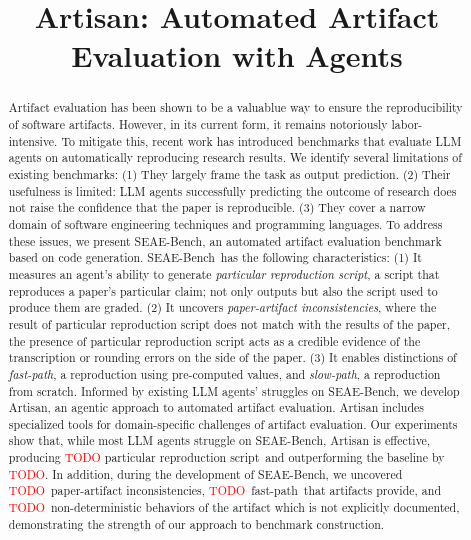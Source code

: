 \documentclass[acmsmall,screen,review,anonymous]{acmart}
\begin{document}
\newcommand\benchmark{SEAE-Bench}
\newcommand\approach{Artisan}

\newcommand\goodscript{particular reproduction script}
\newcommand\newbug{paper-artifact inconsistencies}
\newcommand\fastpath{fast-path}
\newcommand\slowpath{slow-path}

\newcommand\papersetsize{30}
\newcommand\tasksetsize{162}

\newcommand\todo[1]{\textcolor{red}{TODO: #1}}
\newcommand\evalgoodscript{\textcolor{red}{TODO}}
\newcommand\evalgoodscriptoutperform{\textcolor{red}{TODO}}
\newcommand\nondetsize{\textcolor{red}{TODO}}
\newcommand\inconsistenciessize{\textcolor{red}{TODO}}
\newcommand\fastpathsize{\textcolor{red}{TODO}}

\title{Artisan: Automated Artifact Evaluation with Agents}
\begin{abstract}
Artifact evaluation has been shown to be a valuablue way to ensure the reproducibility of software artifacts.
However, in its current form, it remains notoriously labor-intensive.
To mitigate this, recent work has introduced benchmarks that evaluate LLM agents on automatically reproducing research results.
We identify several limitations of existing benchmarks:
(1) They largely frame the task as output prediction.
(2) Their usefulness is limited: LLM agents successfully predicting the outcome of research does not raise the confidence that the paper is reproducible.
(3) They cover a narrow domain of software engineering techniques and programming languages.
To address these issues, we present \benchmark, an automated artifact evaluation benchmark based on code generation.
\benchmark~has the following characteristics:
(1) It measures an agent’s ability to generate \emph{\goodscript{}}, a script that reproduces a paper’s particular claim; not only outputs but also the script used to produce them are graded.
(2) It uncovers \emph{\newbug{}}, where the result of \goodscript{} does not match with the results of the paper, the presence of \goodscript{} acts as a credible evidence of the transcription or rounding errors on the side of the paper.
(3) It enables distinctions of \emph{\fastpath{}}, a reproduction using pre-computed values, and \emph{\slowpath{}}, a reproduction from scratch.
Informed by existing LLM agents’ struggles on \benchmark, we develop Artisan, an agentic approach to automated artifact evaluation.
Artisan includes specialized tools for domain-specific challenges of artifact evaluation.
Our experiments show that, while most LLM agents struggle on \benchmark, Artisan is effective, producing \evalgoodscript{} \goodscript{}~and outperforming the baseline by \evalgoodscriptoutperform{}.
In addition, during the development of \benchmark, we uncovered \inconsistenciessize~\newbug{}, \fastpathsize~\fastpath{}~that artifacts provide, and \nondetsize~non-deterministic behaviors of the artifact which is not explicitly documented, demonstrating the strength of our approach to benchmark construction.
\end{abstract}
\maketitle










\end{document}
